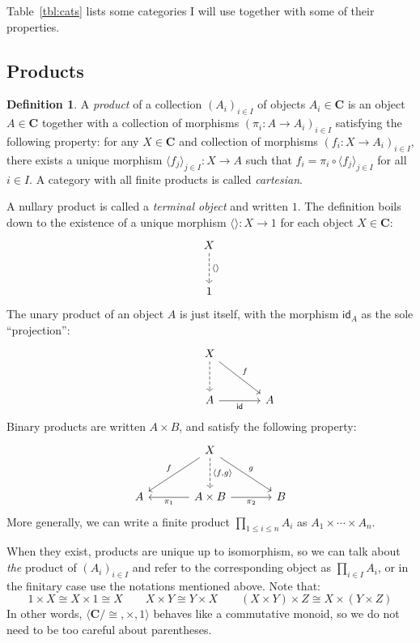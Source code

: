 \documentclass[11pt,oneside,draft]{book}
\theoremstyle{definition}
\newtheorem{definition}[theorem]{Definition}
\newcommand{\kw}[1]{\ensuremath{ \mathsf{#1} }}
\begin{document}
Table~\ref{tbl:cats} lists some categories I will use
together with some of their properties.


\subsection{Products} \label{sec:ct:prod} %

\begin{definition} \label{def:prod}
A \emph{product} of a collection $(A_i)_{i \in I}$
of objects $A_i \in \mathbf{C}$
is an object $A \in \mathbf{C}$
together with a collection of morphisms
$(\pi_i : A \rightarrow A_i)_{i \in I}$
satisfying the following property:
for any $X \in \mathbf{C}$ and collection of morphisms
$(f_i : X \rightarrow A_i)_{i \in I}$,
there exists a unique morphism
$\langle f_j \rangle_{j \in I} : X \rightarrow A$
such that
$f_i = \pi_i \circ \langle f_j \rangle_{j \in I}$
for all $i \in I$.
A category with all finite products is called \emph{cartesian}.
\end{definition}

A nullary product is called a \emph{terminal object} and written $1$.
The definition boils down to the existence of
a unique morphism $\langle \rangle : X \rightarrow 1$
for each object $X \in \mathbf{C}$:
\[
  \begin{tikzcd}[sep=large]
    X \ar[d, dashed, "\langle \rangle"] \\ 1
  \end{tikzcd}
\]
The unary product of an object $A$ is just itself,
with the morphism $\kw{id}_A$ as the sole ``projection'':
\[
  \begin{tikzcd}[sep=large]
    \hspace{0.7em}
    & X \ar[d, dashed] \ar[dr, "f"] & \\
    & A \ar[r, "\kw{id}"'] & A
  \end{tikzcd}
\]
Binary products are written $A \times B$,
and satisfy the following property:
\[
  \begin{tikzcd}[sep=large]
    &
    X \ar[dl, "f"'] \ar[dr, "g"]
      \ar[d, dashed, "{\langle f, g \rangle}"] &
    \\
    A &
    A \times B \ar[l, "\pi_1"] \ar[r, "\pi_2"'] &
    B
  \end{tikzcd}
\]
More generally,
we can write a finite product $\prod_{1 \le i \le n} A_i$
as $A_1 \times \cdots \times A_n$.

When they exist, products are unique up to isomorphism,
so we can talk about \emph{the} product of $(A_i)_{i \in I}$ and
refer to the corresponding object as
$
  \prod_{i \in I} A_i
$,
or in the finitary case use the notations
mentioned above.
Note that:
\[
  1 \times X \cong X \times 1 \cong X
  \qquad
  X \times Y \cong Y \times X
  \qquad
  (X \times Y) \times Z \cong X \times (Y \times Z)
\]
In other words,
$\langle \mathbf{C} / {\cong}, {\times}, 1 \rangle$
behaves like a commutative monoid,
so we do not need to be too careful about parentheses.
\end{document}
